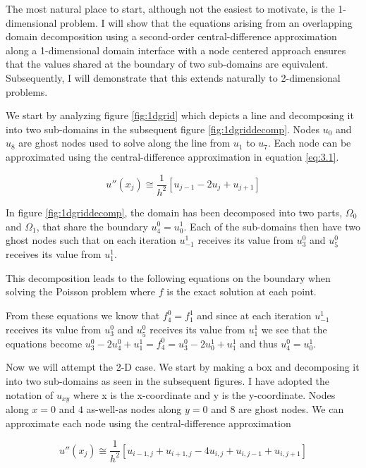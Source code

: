 The most natural place to start, although not the easiest to motivate, is the 1-dimensional problem. I will show that the equations arising from an overlapping domain decomposition using a second-order central-difference approximation along a 1-dimensional domain interface with a node centered approach ensures that the values shared at the boundary of two sub-domains are equivalent. Subsequently, I will demonstrate that this extends naturally to 2-dimensional problems.

We start by analyzing figure \ref{fig:1dgrid} which depicts a line and decomposing it into two sub-domains in the subsequent figure \ref{fig:1dgriddecomp}. Nodes $u_0$ and $u_8$ are ghost nodes used to solve along the line from $u_1$ to $u_7$. Each node can be approximated using the central-difference approximation in equation \ref{eq:3.1}.

\begin{equation}\label{eq:3.1}
	u''(x_{j}) \cong \frac{1}{h^2}[u_{j-1} - 2u_{j} + u_{j+1}]
\end{equation} 



In figure \ref{fig:1dgriddecomp}, the domain has been decomposed into two parts, $\Omega_0$ and $\Omega_1$, that share the boundary $u_4^0 = u_0^1$. Each of the sub-domains then have two ghost nodes such that on each iteration $u_{-1}^1$ receives its value from $u_3^0$ and $u_5^0$ receives its value from $u_1^1$.


This decomposition leads to the following equations on the boundary when solving the Poisson problem where $f$ is the exact solution at each point.


From these equations we know that $f_4^0 = f_1^1$ and since at each iteration $u_{-1}^1$ receives its value from $u_3^0$ and $u_5^0$ receives its value from $u_1^1$ we see that the equations become $u_3^0 - 2u_4^0 + u_1^1 = f_4^0 = u_3^0 - 2u_0^1 + u_1^1$ and thus $u_4^0 = u_0^1$.

Now we will attempt the 2-D case. We start by making a box and decomposing it into two sub-domains as seen in the subsequent figures. I have adopted the notation of $u_{xy}$ where x is the x-coordinate and y is the y-coordinate. Nodes along $x = 0$ and $4$ as-well-as nodes along $y = 0$ and $8$ are ghost nodes. We can approximate each node using the central-difference approximation

\begin{equation}
	u''(x_{j}) \cong \frac{1}{h^2}[u_{i-1,j} + u_{i+1,j} - 4u_{i,j} + u_{i,j-1} + u_{i,j+1}]
\end{equation}

